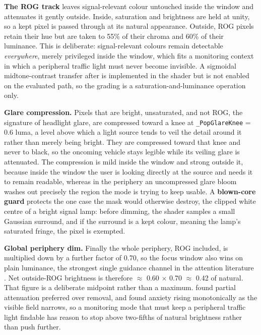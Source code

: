 \textbf{The ROG track} leaves signal-relevant colour untouched inside the window and attenuates it
gently outside. Inside, saturation and brightness are held at unity, so a kept pixel is passed
through at its natural appearance. Outside, ROG pixels retain their hue but are taken to 55\% of
their chroma and 60\% of their luminance. This is deliberate: signal-relevant colours remain
detectable \textit{everywhere}, merely privileged inside the window, which fits a monitoring context
in which a peripheral traffic light must never become invisible. A sigmoidal midtone-contrast
transfer after \citet{sutton2022} is implemented in the shader but is not enabled on the evaluated
path, so the grading is a saturation-and-luminance operation only.

\textbf{Glare compression.} Pixels that are bright, unsaturated, and not ROG, the signature of
headlight glare, are compressed toward a knee at \verb|_PopGlareKnee| = 0.6 luma, a level above
which a light source tends to veil the detail around it rather than merely being bright. They
are compressed toward that knee and never to black, so the oncoming vehicle stays legible while its
veiling glare is attenuated. The compression is mild inside the window and strong outside it, because
inside the window the user is looking directly at the source and needs it to remain readable, whereas
in the periphery an uncompressed glare bloom washes out precisely the region the mode is trying to
keep usable. A \textbf{blown-core guard} protects the one case the mask would otherwise destroy, the
clipped white centre of a bright signal lamp: before dimming, the shader samples a small Gaussian
surround, and if the surround is a kept colour, meaning the lamp's saturated fringe, the pixel is
exempted.

\textbf{Global periphery dim.} Finally the whole periphery, ROG included, is multiplied down by a
further factor of 0.70, so the focus window also wins on plain luminance, the strongest single
guidance channel in the attention literature \citep{bailey2009,grogorick2017}. Net outside-ROG
brightness is therefore $\approx$ 0.60 $\times$ 0.70 $\approx$ 0.42 of natural. That
figure is a deliberate midpoint rather than a maximum. \citet{cheng2022} found partial attenuation
preferred over removal, and \citet{barhorstcates2016} found anxiety rising monotonically as the
visible field narrows, so a monitoring mode that must keep a peripheral traffic light findable has
reason to stop above two-fifths of natural brightness rather than push further.


